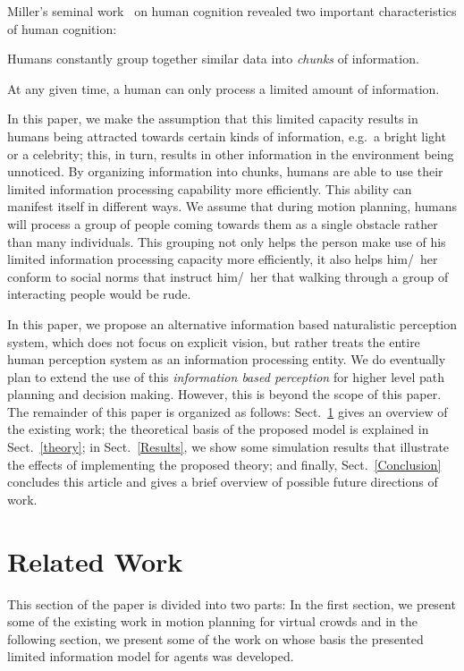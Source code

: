 \documentclass[runningheads,a4paper]{llncs}
\begin{document}
Miller's seminal work~\cite{Miller:1956tr} on human cognition revealed two important characteristics of human cognition: 
\begin{inparaenum} 
\item Humans constantly group together similar data into \emph{chunks} of information. 
\item At any given time, a human can only process a limited amount of information. 
\end{inparaenum}
In this paper, we make the assumption that this limited capacity results in humans being attracted towards certain kinds of information, e.g.\ a bright light or a celebrity; this, in turn, results in other information in the environment being unnoticed. By organizing information into chunks, humans are able to use their limited information processing capability more efficiently. This ability can manifest itself in different ways. We assume that during motion planning, humans will process a group of people coming towards them as a single obstacle rather than many individuals. This grouping not only helps the person make use of his limited information processing capacity more efficiently, it also helps him/~her conform to social norms that instruct him/~her that walking through a group of interacting people would be rude.

In this paper, we propose an alternative information based naturalistic perception system, which does not focus
on explicit vision, but rather treats the entire human perception system as an information processing entity. We do eventually plan to extend the use of this \emph{information based perception} for higher level path planning and decision making. However, this is beyond the scope of this paper. The remainder of this paper is organized as follows: Sect.~\ref{LitRev} gives an overview of the existing work; the theoretical basis of the proposed model is explained in Sect.~\ref{theory}; in Sect.~\ref{Results}, we show some simulation results that illustrate the effects of implementing the proposed theory; and finally, Sect.~\ref{Conclusion} concludes this article and gives a brief overview of possible future directions of work.


\section{Related Work}
\label{LitRev}

This section of the paper is divided into two parts: In the first section, we present some of the existing work in motion planning for virtual crowds and in the following section, we present some of the work on whose basis the presented limited information model for agents was developed.
\end{document}
